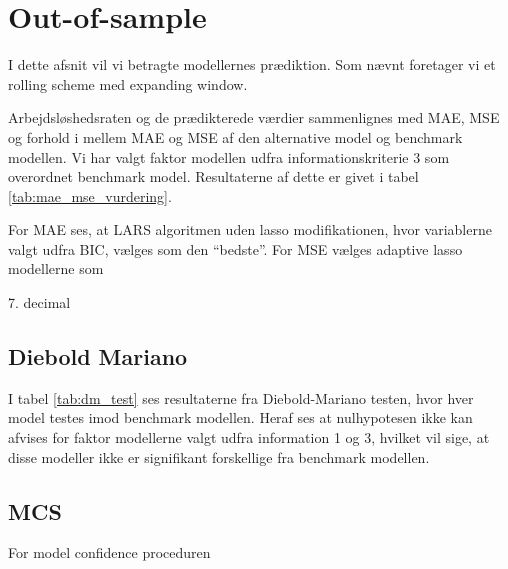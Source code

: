\section{Out-of-sample}
I dette afsnit vil vi betragte modellernes prædiktion.
Som nævnt foretager vi et rolling scheme med expanding window.

Arbejdsløshedsraten og de prædikterede værdier sammenlignes med MAE, MSE og forhold i mellem MAE og MSE af den alternative model og benchmark modellen.
Vi har valgt faktor modellen udfra informationskriterie 3 som overordnet benchmark model.
Resultaterne af dette er givet i tabel \ref{tab:mae_mse_vurdering}.
%

%
For MAE ses, at LARS algoritmen uden lasso modifikationen, hvor variablerne valgt udfra BIC, vælges som den ``bedste''.
For MSE vælges adaptive lasso modellerne som 

7. decimal

\subsection{Diebold Mariano}
I tabel \ref{tab:dm_test} ses resultaterne fra Diebold-Mariano testen, hvor hver model testes imod benchmark modellen.
Heraf ses at nulhypotesen ikke kan afvises for faktor modellerne valgt udfra information 1 og 3, hvilket vil sige, at disse modeller ikke er signifikant forskellige fra benchmark modellen.
%

%
\subsection{MCS} 
For model confidence proceduren 
